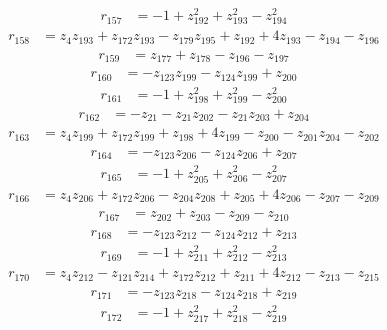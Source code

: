 \begin{align*}
r_{157} &=-1+z_{192}^{2}+z_{193}^{2}-z_{194}^{2}
\end{align*}
\begin{align*}
r_{158} &=z_{4}z_{193}+z_{172}z_{193}-z_{179}z_{195}+z_{192}+4z_{193}-z_{194}-z_{196}
\end{align*}
\begin{align*}
r_{159} &=z_{177}+z_{178}-z_{196}-z_{197}
\end{align*}
\begin{align*}
r_{160} &=-z_{123}z_{199}-z_{124}z_{199}+z_{200}
\end{align*}
\begin{align*}
r_{161} &=-1+z_{198}^{2}+z_{199}^{2}-z_{200}^{2}
\end{align*}
\begin{align*}
r_{162} &=-z_{21}-z_{21}z_{202}-z_{21}z_{203}+z_{204}
\end{align*}
\begin{align*}
r_{163} &=z_{4}z_{199}+z_{172}z_{199}+z_{198}+4z_{199}-z_{200}-z_{201}z_{204}-z_{202}
\end{align*}
\begin{align*}
r_{164} &=-z_{123}z_{206}-z_{124}z_{206}+z_{207}
\end{align*}
\begin{align*}
r_{165} &=-1+z_{205}^{2}+z_{206}^{2}-z_{207}^{2}
\end{align*}
\begin{align*}
r_{166} &=z_{4}z_{206}+z_{172}z_{206}-z_{204}z_{208}+z_{205}+4z_{206}-z_{207}-z_{209}
\end{align*}
\begin{align*}
r_{167} &=z_{202}+z_{203}-z_{209}-z_{210}
\end{align*}
\begin{align*}
r_{168} &=-z_{123}z_{212}-z_{124}z_{212}+z_{213}
\end{align*}
\begin{align*}
r_{169} &=-1+z_{211}^{2}+z_{212}^{2}-z_{213}^{2}
\end{align*}
\begin{align*}
r_{170} &=z_{4}z_{212}-z_{121}z_{214}+z_{172}z_{212}+z_{211}+4z_{212}-z_{213}-z_{215}
\end{align*}
\begin{align*}
r_{171} &=-z_{123}z_{218}-z_{124}z_{218}+z_{219}
\end{align*}
\begin{align*}
r_{172} &=-1+z_{217}^{2}+z_{218}^{2}-z_{219}^{2}
\end{align*}

